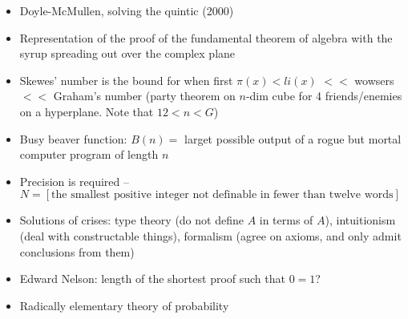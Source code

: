 \documentclass[11pt]{scrartcl}
\begin{document}
\begin{itemize}
\item Doyle-McMullen,  solving the quintic (2000)
\item Representation of the proof of the fundamental theorem of
  algebra with the syrup spreading out over the complex plane
\item Skewes' number is the bound for when first $\pi(x) < li(x)$ $<<$
  wowsers $<<$ Graham's number (party theorem on $n$-dim cube for 4
  friends/enemies on a hyperplane. Note that $12 < n < G$)
\item Busy beaver function: $B(n)=$ larget possible output of a rogue
  but mortal computer program of length $n$
\item Precision is required --
  $N = [\text{the smallest positive integer not definable in fewer
    than twelve words}]$
\item Solutions of crises: type theory (do not define $A$ in terms of
  $A$), intuitionism (deal with constructable things), formalism
  (agree on axioms, and only admit conclusions from them)
\item Edward Nelson: length of the shortest proof such that $0=1$?
\item Radically elementary theory of probability
\end{itemize}
\end{document}
